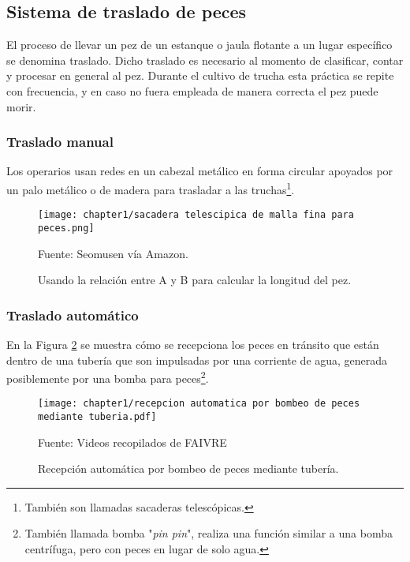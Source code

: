 \subsection{Sistema de traslado de peces}

El proceso de llevar un pez de un estanque o jaula flotante a un lugar específico se denomina traslado. Dicho traslado es necesario al momento de clasificar, contar y procesar en general al pez. Durante el cultivo de trucha esta práctica se repite con frecuencia, y en caso no fuera empleada de manera correcta el pez puede morir.

\subsubsection{Traslado manual}

Los operarios usan redes en un cabezal metálico en forma circular apoyados por un palo metálico o de madera para trasladar a las truchas\footnote{También son llamadas sacaderas telescópicas.}.

\begin{figure}[H]
	\centering
	\texttt{[image: chapter1/sacadera telescipica de malla fina para peces.png]}
	\caption{Usando la relación  entre A y B para calcular la longitud del pez.}
	\begin{myflushleftportland}
		Fuente: Seomusen vía Amazon.
	\end{myflushleftportland}	
	\label{fig:sacadera telescipica de malla fina para peces}
\end{figure}

\subsubsection{Traslado automático}

En la Figura \ref{fig:recepcion automatica por bombeo de peces mediante tuberia} se muestra cómo se recepciona los peces en tránsito que están dentro de una tubería que son impulsadas por una corriente de agua, generada posiblemente por una bomba para peces\footnote{También llamada bomba "\textit{pin pin}", realiza una función similar a una bomba centrífuga, pero con peces en lugar de solo agua.}.

\begin{figure}[H]
	\centering
	\texttt{[image: chapter1/recepcion automatica por bombeo de peces mediante tuberia.pdf]}
	\caption{Recepción automática por bombeo de peces mediante tubería.}
	\begin{myflushleftportland}
		Fuente: Videos recopilados de FAIVRE
	\end{myflushleftportland}
	\label{fig:recepcion automatica por bombeo de peces mediante tuberia}
\end{figure}

